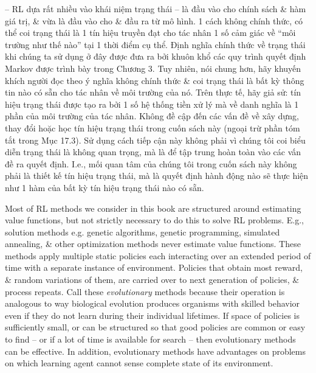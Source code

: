 \documentclass{article}
\begin{document}
\begin{itemize}
\begin{itemize}
        -- RL dựa rất nhiều vào khái niệm trạng thái -- là đầu vào cho chính sách \& hàm giá trị, \& vừa là đầu vào cho \& đầu ra từ mô hình. 1 cách không chính thức, có thể coi trạng thái là 1 tín hiệu truyền đạt cho tác nhân 1 số cảm giác về ``môi trường như thế nào'' tại 1 thời điểm cụ thể. Định nghĩa chính thức về trạng thái khi chúng ta sử dụng ở đây được đưa ra bởi khuôn khổ các quy trình quyết định Markov được trình bày trong Chương 3. Tuy nhiên, nói chung hơn, hãy khuyến khích người đọc theo ý nghĩa không chính thức \& coi trạng thái là bất kỳ thông tin nào có sẵn cho tác nhân về môi trường của nó. Trên thực tế, hãy giả sử: tín hiệu trạng thái được tạo ra bởi 1 số hệ thống tiền xử lý mà về danh nghĩa là 1 phần của môi trường của tác nhân. Không đề cập đến các vấn đề về xây dựng, thay đổi hoặc học tín hiệu trạng thái trong cuốn sách này (ngoại trừ phần tóm tắt trong Mục 17.3). Sử dụng cách tiếp cận này không phải vì chúng tôi coi biểu diễn trạng thái là không quan trọng, mà là để tập trung hoàn toàn vào các vấn đề ra quyết định. I.e., mối quan tâm của chúng tôi trong cuốn sách này không phải là thiết kế tín hiệu trạng thái, mà là quyết định hành động nào sẽ thực hiện như 1 hàm của bất kỳ tín hiệu trạng thái nào có sẵn.

        Most of RL methods we consider in this book are structured around estimating value functions, but not strictly necessary to do this to solve RL problems. E.g., solution methods e.g. genetic algorithms, genetic programming, simulated annealing, \& other optimization methods never estimate value functions. These methods apply multiple static policies each interacting over an extended period of time with a separate instance of environment. Policies that obtain most reward, \& random variations of them, are carried over to next generation of policies, \& process repeats. Call these {\it evolutionary} methods because their operation is analogous to way biological evolution produces organisms with skilled behavior even if they do not learn during their individual lifetimes. If space of policies is sufficiently small, or can be structured so that good policies are common or easy to find -- or if a lot of time is available for search -- then evolutionary methods can be effective. In addition, evolutionary methods have advantages on problems on which learning agent cannot sense complete state of its environment.


\end{itemize}
\end{itemize}
\end{document}
